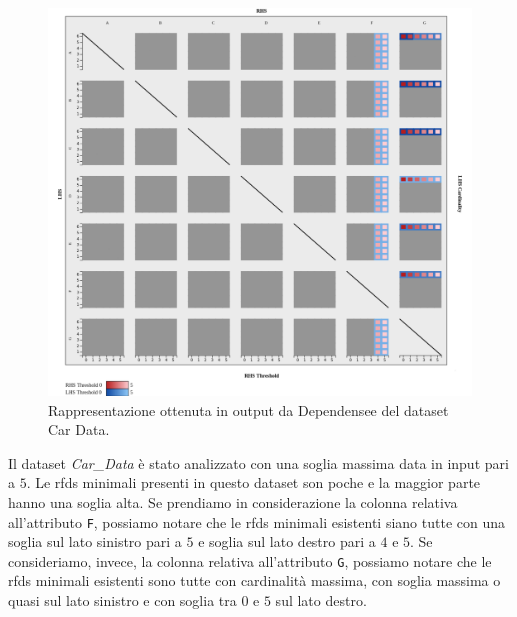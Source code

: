 \begin{figure}[ht]
    \centering
    \includegraphics[width=\linewidth]{capitoli/figure/car_data}
    \caption{Rappresentazione ottenuta in output da Dependensee del dataset Car Data.}
    \label{fig:cardata_result}
\end{figure}
Il dataset \textit{Car\_Data} \`{e} stato analizzato con una soglia massima data in input pari a $5$. Le \acrlong{rfds} minimali presenti in questo dataset son poche e la maggior parte hanno una soglia alta. Se prendiamo in considerazione la colonna relativa all'attributo \texttt{F}, possiamo notare che le \acrlong{rfds} minimali esistenti siano tutte con una soglia sul lato sinistro pari a $5$ e soglia sul lato destro pari a $4$ e $5$. Se consideriamo, invece, la colonna relativa all'attributo \texttt{G}, possiamo notare che le \acrlong{rfds} minimali esistenti sono tutte con cardinalit\`{a} massima, con soglia massima o quasi sul lato sinistro e con soglia tra $0$ e $5$ sul lato destro.